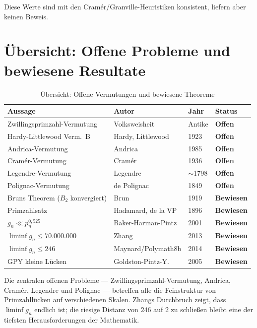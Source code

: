 \documentclass[12pt,a4paper]{amsart}
\theoremstyle{definition}
\begin{document}
Diese Werte sind mit den Cram\'{e}r/Granville-Heuristiken konsistent, liefern
aber keinen Beweis.

\section{\"{U}bersicht: Offene Probleme und bewiesene Resultate}

\begin{table}[h]
\centering
\caption{\"{U}bersicht: Offene Vermutungen und bewiesene Theoreme}
\begin{tabular}{@{}llll@{}}
\toprule
Aussage & Autor & Jahr & Status \\
\midrule
Zwillingsprimzahl-Vermutung & Volksweisheit & Antike & \textbf{Offen} \\
Hardy-Littlewood Verm.\ B & Hardy, Littlewood & 1923 & \textbf{Offen} \\
Andrica-Vermutung & Andrica & 1985 & \textbf{Offen} \\
Cram\'{e}r-Vermutung & Cram\'{e}r & 1936 & \textbf{Offen} \\
Legendre-Vermutung & Legendre & $\sim$1798 & \textbf{Offen} \\
Polignac-Vermutung & de Polignac & 1849 & \textbf{Offen} \\
\midrule
Bruns Theorem ($B_2$ konvergiert) & Brun & 1919 & \textbf{Bewiesen} \\
Primzahlsatz & Hadamard, de la VP & 1896 & \textbf{Bewiesen} \\
$g_n \ll p_n^{0{,}525}$ & Baker-Harman-Pintz & 2001 & \textbf{Bewiesen} \\
$\liminf g_n \leq 70{.}000{.}000$ & Zhang & 2013 & \textbf{Bewiesen} \\
$\liminf g_n \leq 246$ & Maynard/Polymath8b & 2014 & \textbf{Bewiesen} \\
GPY kleine L\"{u}cken & Goldston-Pintz-Y. & 2005 & \textbf{Bewiesen} \\
\bottomrule
\end{tabular}
\end{table}

Die zentralen offenen Probleme --- Zwillingsprimzahl-Vermutung, Andrica, Cram\'{e}r,
Legendre und Polignac --- betreffen alle die Feinstruktur von Primzahll\"{u}cken auf
verschiedenen Skalen. Zhangs Durchbruch zeigt, dass $\liminf g_n$ endlich ist;
die riesige Distanz von $246$ auf $2$ zu schlie\ss{}en bleibt eine der tiefsten
Herausforderungen der Mathematik.
\end{document}
